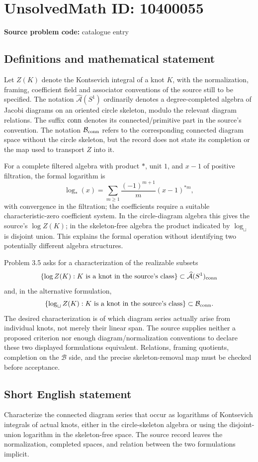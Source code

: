 \documentclass[11pt]{article}
\begin{document}
\section*{UnsolvedMath ID: 10400055}
\textbf{Source problem code:} catalogue entry
\subsection{Definitions and mathematical statement}
Let \(Z(K)\) denote the Kontsevich integral of a knot \(K\), with the normalization, framing, coefficient field and associator conventions of the source still to be specified. The notation \(\widehat{\mathcal A}(S^1)\) ordinarily denotes a degree-completed algebra of Jacobi diagrams on an oriented circle skeleton, modulo the relevant diagram relations. The suffix \({\rm conn}\) denotes its connected/primitive part in the source's convention. The notation \(\mathcal B_{\rm conn}\) refers to the corresponding connected diagram space without the circle skeleton, but the record does not state its completion or the map used to transport \(Z\) into it.

For a complete filtered algebra with product \(*\), unit \(1\), and \(x-1\) of positive filtration, the formal logarithm is
\[
 \log_*(x)=\sum_{m\ge1}\frac{(-1)^{m+1}}{m}(x-1)^{*m},
\]
with convergence in the filtration; the coefficients require a suitable characteristic-zero coefficient system. In the circle-diagram algebra this gives the source's \(\log Z(K)\); in the skeleton-free algebra the product indicated by \(\log_{\sqcup}\) is disjoint union. This explains the formal operation without identifying two potentially different algebra structures.

Problem 3.5 asks for a characterization of the realizable subsets
\[
 \{\log Z(K):K\text{ is a knot in the source's class}\}
       \subset\widehat{\mathcal A}(S^1)_{\rm conn}
\]
and, in the alternative formulation,
\[
 \{\log_{\sqcup} Z(K):K\text{ is a knot in the source's class}\}
       \subset\mathcal B_{\rm conn}.
\]
The desired characterization is of which diagram series actually arise from individual knots, not merely their linear span. The source supplies neither a proposed criterion nor enough diagram/normalization conventions to declare these two displayed formulations equivalent. Relations, framing quotients, completion on the \(\mathcal B\) side, and the precise skeleton-removal map must be checked before acceptance.
\subsection{Short English statement}
Characterize the connected diagram series that occur as logarithms of Kontsevich integrals of actual knots, either in the circle-skeleton algebra or using the disjoint-union logarithm in the skeleton-free space. The source record leaves the normalization, completed spaces, and relation between the two formulations implicit.
\end{document}
